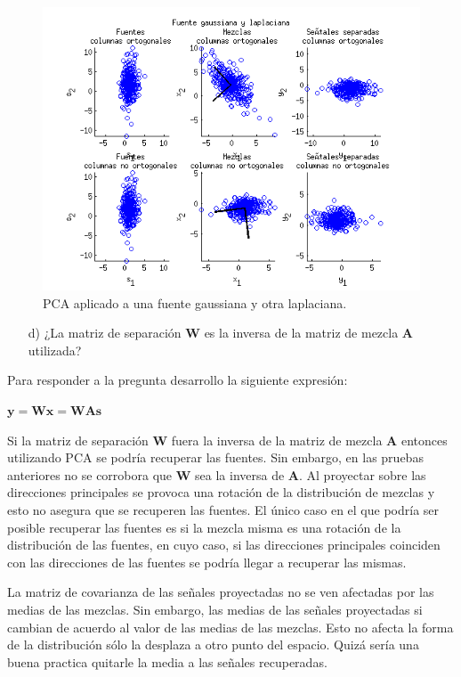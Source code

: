 \documentclass[11pt,a4paper,final]{article}
\begin{document}
\begin{figure}
\includegraphics [width=\textwidth]{Ejercicio3_03.png}
\caption{PCA aplicado a una fuente gaussiana y otra laplaciana.}
\label{fig:ejercicio333}
\end{figure}


\begin{enumerate}
   \item[d)] ¿La matriz de separación $\mathbf{W}$ es la inversa de la matriz de mezcla $\mathbf{A}$ utilizada?
\end{enumerate}

Para responder a la pregunta desarrollo la siguiente expresión:

$\mathbf{y} = \mathbf{W} \mathbf{x} = \mathbf{W} \mathbf{A} \mathbf{s}$

Si la matriz de separación $\mathbf{W}$ fuera la inversa de la matriz de mezcla $\mathbf{A}$ entonces utilizando PCA se podría recuperar las fuentes. Sin embargo, en las pruebas anteriores no se corrobora que $\mathbf{W}$ sea la inversa de $\mathbf{A}$. Al proyectar sobre las direcciones principales se provoca una rotación de la distribución de mezclas y esto no asegura que se recuperen las fuentes. El único caso en el que podría ser posible recuperar las fuentes es si la mezcla misma es una rotación de la distribución de las fuentes, en cuyo caso, si las direcciones principales coinciden con las direcciones de las fuentes se podría llegar a recuperar las mismas.

La matriz de covarianza de las señales proyectadas no se ven afectadas por las medias de las mezclas. Sin embargo, las medias de las señales proyectadas si cambian de acuerdo al valor de las medias de las mezclas. Esto no afecta la forma de la distribución sólo la desplaza a otro punto del espacio. Quizá sería una buena practica quitarle la media a las señales recuperadas.
\end{document}
